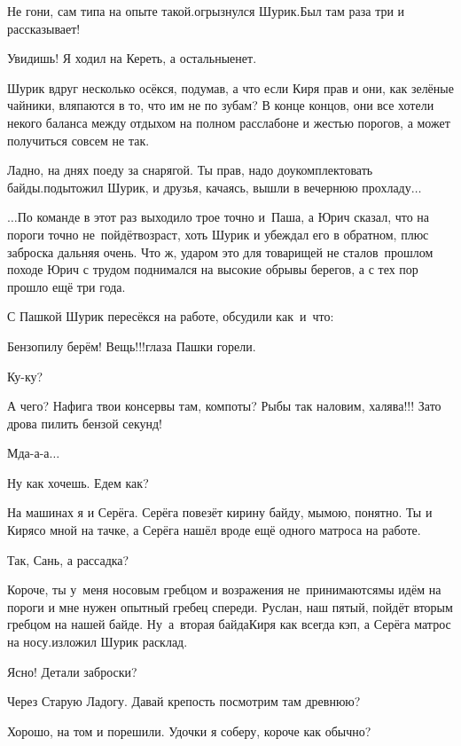 \diagdash Не гони, сам типа на опыте такой.\mdash огрызнулся Шурик.\mdash Был там раза три и рассказывает!

\diagdash Увидишь! Я ходил на Кереть, а остальные\mdash нет.

Шурик вдруг несколько осёкся, подумав, а что если Киря прав и они, как зелёные чайники, вляпаются в то, что им не по зубам? В конце концов, они все хотели некого баланса между отдыхом на полном расслабоне и жестью порогов, а может получиться совсем не так. 

\diagdash Ладно, на днях поеду за снарягой. Ты прав, надо доукомплектовать байды.\mdash подытожил Шурик, и друзья, качаясь, вышли в вечернюю прохладу$\ldots$

\vspace{0.5cm}
$\ldots$По команде в этот раз выходило трое точно и~Паша, а Юрич сказал, что на пороги точно не~пойдёт\mdash возраст, хоть Шурик и убеждал его в обратном, плюс заброска дальняя очень. Что ж, ударом это для товарищей не стало\mdash в~прошлом походе Юрич с трудом поднимался на высокие обрывы берегов, а с тех пор прошло ещё три года.

С Пашкой Шурик пересёкся на работе, обсудили как~и~что:

\diagdash Бензопилу берём! Вещь!!!\mdash глаза Пашки горели.

\diagdash Ку-ку?

\diagdash А чего? Нафига твои консервы там, компоты? Рыбы так наловим, халява!!! Зато дрова пилить бензой секунд!

\diagdash Мда-а-а$\ldots$

\diagdash Ну как хочешь. Едем как?

\diagdash На машинах я и Серёга. Серёга повезёт кирину байду, мы\mdash мою, понятно. Ты и Киря\mdash со мной на тачке, а Серёга нашёл вроде ещё одного матроса на работе.

\diagdash Так, Сань, а рассадка?

\diagdash Короче, ты у~меня носовым гребцом и возражения не~принимаются\mdash мы идём на пороги и мне нужен опытный гребец спереди. Руслан, наш пятый, пойдёт вторым гребцом на нашей байде. Ну~а~вторая байда\mdash Киря как всегда кэп, а Серёга матрос на носу.\mdash изложил Шурик расклад.

\diagdash Ясно! Детали заброски?

\diagdash Через Старую Ладогу. Давай крепость посмотрим там древнюю?

\diagdash Хорошо, на том и порешили. Удочки я соберу, короче как обычно?

